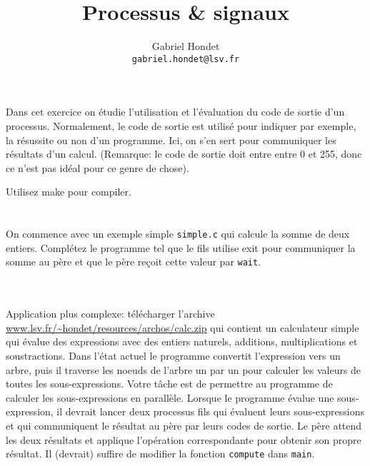 \documentclass{exam}
\title{Processus \& signaux}
\author{Gabriel Hondet\\\texttt{gabriel.hondet@lsv.fr}}
\date{}
\begin{document}
\maketitle

\begin{questions}

  \question{}
  Dans cet exercice on étudie l’utilisation et l’évaluation du code de sortie d’un
  processus. Normalement, le code de sortie est utilisé pour indiquer par exemple,
  la résussite ou non d’un programme. Ici, on s’en sert pour communiquer les
  résultats d’un calcul. (Remarque: le code de sortie doit entre entre 0 et 255,
  donc ce n’est pas idéal pour ce genre de chose).

  Utilisez make pour compiler.

  \begin{parts}
    \part{}
    On commence avec un exemple simple \texttt{simple.c} qui calcule la
    somme de deux entiers. Complétez le programme tel que le fils utilise exit
    pour communiquer la somme au père et que le père reçoit cette valeur par
    \texttt{wait}.
    \begin{solution}
      \inputminted{C}{corrected/simple.c}
    \end{solution}


    \part{}
    Application plus complexe: télécharger l’archive
    \url{www.lsv.fr/~hondet/resources/archos/calc.zip} qui
    contient un calculateur simple qui évalue des expressions avec des entiers
    naturels, additions, multiplications et soustractions. Dans l’état actuel le
    programme convertit l’expression vers un arbre, puis il traverse les noeuds de
    l’arbre un par un pour calculer les valeurs de toutes les sous-expressions.
    Votre tâche est de permettre au programme de calculer les sous-expressions en
    parallèle. Lorsque le programme évalue une sous-expression, il devrait lancer
    deux processus fils qui évaluent leurs sous-expressions et qui communiquent le
    résultat au père par leurs codes de sortie. Le père attend les deux résultats
    et applique l’opération correspondante pour obtenir son propre résultat. Il
    (devrait) suffire de modifier la fonction \texttt{compute} dans
    \texttt{main}.
    \begin{solution}
      \inputminted[tabsize=2]{C}{corrected/calc_main.c}
    \end{solution}
    \end{parts}


\end{questions}
\end{document}
